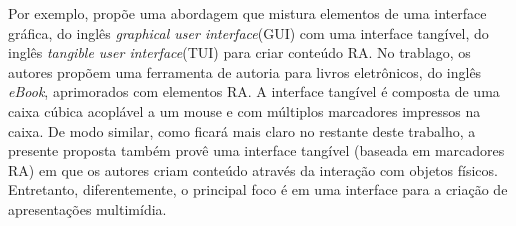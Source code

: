 \documentclass[../main.tex]{subfiles}
\begin{document}
Por exemplo,  propõe uma abordagem que mistura elementos de uma interface gráfica, do inglês \emph{graphical user interface}(GUI) com uma interface tangível, do inglês \emph{tangible user interface}(TUI) para criar conteúdo RA. No trablago, os autores propõem uma ferramenta de autoria para livros eletrônicos, do inglês \emph{eBook}, aprimorados com elementos RA. A interface tangível é composta de uma caixa cúbica acoplável a um mouse e com múltiplos marcadores impressos na caixa. De modo similar, como ficará mais claro no restante deste trabalho, a presente proposta também provê uma interface tangível (baseada em marcadores RA) em que os autores criam conteúdo através da interação com objetos físicos. Entretanto, diferentemente, o principal foco é em uma interface para a criação de apresentações multimídia.
\end{document}
